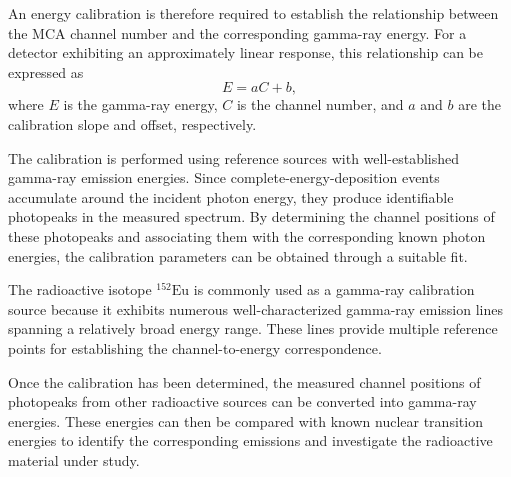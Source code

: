 An energy calibration is therefore required to establish the relationship between the MCA channel number and the corresponding gamma-ray energy. For a detector exhibiting an approximately linear response, this relationship can be expressed as
\begin{equation}
    E=aC+b,
\end{equation}
where $E$ is the gamma-ray energy, $C$ is the channel number, and $a$ and $b$ are the calibration slope and offset, respectively.

The calibration is performed using reference sources with well-established gamma-ray emission energies. Since complete-energy-deposition events accumulate around the incident photon energy, they produce identifiable photopeaks in the measured spectrum. By determining the channel positions of these photopeaks and associating them with the corresponding known photon energies, the calibration parameters can be obtained through a suitable fit.

The radioactive isotope $^{152}\mathrm{Eu}$ is commonly used as a gamma-ray calibration source because it exhibits numerous well-characterized gamma-ray emission lines spanning a relatively broad energy range. These lines provide multiple reference points for establishing the channel-to-energy correspondence.

Once the calibration has been determined, the measured channel positions of photopeaks from other radioactive sources can be converted into gamma-ray energies. These energies can then be compared with known nuclear transition energies to identify the corresponding emissions and investigate the radioactive material under study.
